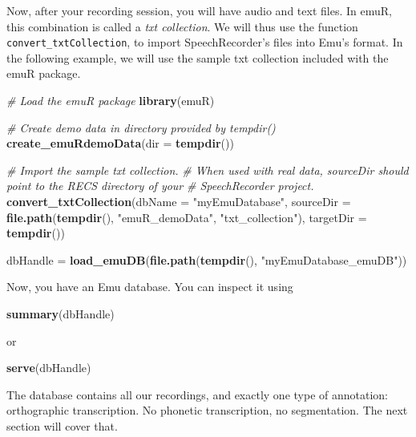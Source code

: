 \documentclass[]{book}
\newenvironment{Shaded}{\begin{snugshade}}{\end{snugshade}}
\newcommand{\KeywordTok}[1]{\textcolor[rgb]{0.13,0.29,0.53}{\textbf{{#1}}}}
\newcommand{\DataTypeTok}[1]{\textcolor[rgb]{0.13,0.29,0.53}{{#1}}}
\newcommand{\StringTok}[1]{\textcolor[rgb]{0.31,0.60,0.02}{{#1}}}
\newcommand{\CommentTok}[1]{\textcolor[rgb]{0.56,0.35,0.01}{\textit{{#1}}}}
\newcommand{\NormalTok}[1]{{#1}}
\theoremstyle{definition}
\theoremstyle{definition}
\theoremstyle{definition}
\theoremstyle{remark}
\begin{document}
Now, after your recording session, you will have audio and text files.
In emuR, this combination is called a \emph{txt collection}. We will
thus use the function \texttt{convert\_txtCollection}, to import
SpeechRecorder's files into Emu's format. In the following example, we
will use the sample txt collection included with the emuR package.

\begin{Shaded}
\begin{Highlighting}[]
\CommentTok{# Load the emuR package}
\KeywordTok{library}\NormalTok{(emuR)}

\CommentTok{# Create demo data in directory provided by tempdir()}
\KeywordTok{create_emuRdemoData}\NormalTok{(}\DataTypeTok{dir =} \KeywordTok{tempdir}\NormalTok{())}

\CommentTok{# Import the sample txt collection.}
\CommentTok{# When used with real data, sourceDir should point to the RECS directory of your}
\CommentTok{# SpeechRecorder project.}
\KeywordTok{convert_txtCollection}\NormalTok{(}\DataTypeTok{dbName =} \StringTok{"myEmuDatabase"}\NormalTok{,}
                      \DataTypeTok{sourceDir =} \KeywordTok{file.path}\NormalTok{(}\KeywordTok{tempdir}\NormalTok{(), }\StringTok{"emuR_demoData"}\NormalTok{, }\StringTok{"txt_collection"}\NormalTok{),}
                      \DataTypeTok{targetDir =} \KeywordTok{tempdir}\NormalTok{())}

\NormalTok{dbHandle =}\StringTok{ }\KeywordTok{load_emuDB}\NormalTok{(}\KeywordTok{file.path}\NormalTok{(}\KeywordTok{tempdir}\NormalTok{(), }\StringTok{"myEmuDatabase_emuDB"}\NormalTok{))}
\end{Highlighting}
\end{Shaded}

Now, you have an Emu database. You can inspect it using

\begin{Shaded}
\begin{Highlighting}[]
\KeywordTok{summary}\NormalTok{(dbHandle)}
\end{Highlighting}
\end{Shaded}

or

\begin{Shaded}
\begin{Highlighting}[]
\KeywordTok{serve}\NormalTok{(dbHandle)}
\end{Highlighting}
\end{Shaded}

The database contains all our recordings, and exactly one type of
annotation: orthographic transcription. No phonetic transcription, no
segmentation. The next section will cover that.
\end{document}
